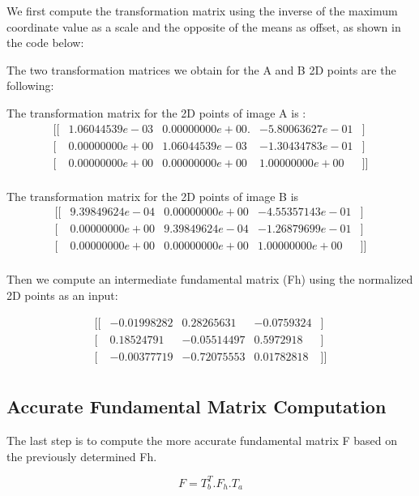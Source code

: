 \documentclass[a4paper,11pt]{article}
\begin{document}
We first compute the transformation matrix using the inverse of the maximum coordinate value as a scale and the opposite of the means as offset, as shown in the code below:

\lstset{style=mystyle}


The two transformation matrices we obtain for the A and B 2D points are the following:

The transformation matrix for the 2D points of image A is : 
$$
\begin{matrix}
[ [ & 1.06044539e-03& 0.00000000e+00. & -5.80063627e-01 & ]\\
 [ & 0.00000000e+00 & 1.06044539e-03 &  -1.30434783e-01 &]\\
 [ &0.00000000e+00 & 0.00000000e+00 & 1.00000000e+00 &]] \\
\end{matrix}
$$


The transformation matrix for the 2D points of image B is
$$
\begin{matrix}
[ [ &9.39849624e-04 &0.00000000e+00  & -4.55357143e-01& ]\\
 [ & 0.00000000e+00 & 9.39849624e-04 &  -1.26879699e-01 &]\\
 [ &0.00000000e+00 & 0.00000000e+00  & 1.00000000e+00 &]] \\
\end{matrix}
$$


Then we compute an intermediate fundamental matrix (Fh) using the normalized 2D points as an input:

$$
\begin{matrix}
[ [ &-0.01998282 &0.28265631  & -0.0759324& ]\\
 [ &0.18524791 & -0.05514497 &  0.5972918 &]\\
 [ &-0.00377719 & -0.72075553  &0.01782818 &]] \\
\end{matrix}
$$

\subsection{Accurate Fundamental Matrix Computation}

The last step is to compute the more accurate fundamental matrix F based on the previously determined Fh.

$$F = T_{b}^T.F_{h}.T_{a}$$
\end{document}

